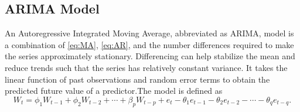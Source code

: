 \documentclass[12pt, centerh1]{article}
\begin{document}
\subsection{ARIMA Model}

An Autoregressive Integrated Moving Average, abbreviated as ARIMA, model is a combination of \eqref{eq:MA}, \eqref{eq:AR}, and the number differences required to make the series approximately stationary. Differencing can help stabilize the mean and reduce trends such that the series has relatively constant variance. It takes the linear function of past observations and random error terms to obtain the predicted future value of a predictor.The model is defined as
\begin{equation}\label{eq:ARIMA}
        W_t = \phi_1W_{t-1} + \phi_2W_{t-2} + \cdots + \beta_pW_{t-p} + e_t - \theta_1e_{t-1} - \theta_2e_{t-2} - \cdots - \theta_qe_{t-q}. 
\end{equation}
\end{document}
